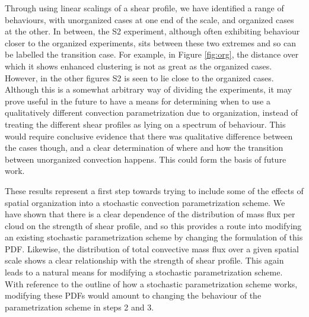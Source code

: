 \documentclass[11pt,a4paper]{article}
\newcommand\todo[1]{\textbf{TODO: #1}}
\begin{document}



Through using linear scalings of a shear profile, we have identified a range of behaviours, with unorganized cases at one end of the scale, and organized cases at the other. In between, the S2 experiment, although often exhibiting behaviour closer to the organized experiments, sits between these two extremes and so can be labelled the transition case. For example, in Figure \ref{fig:org}, the distance over which it shows enhanced clustering is not as great as the organized cases. However, in the other figures S2 is seen to lie close to the organized cases. Although this is a somewhat arbitrary way of dividing the experiments, it may prove useful in the future to have a means for determining when to use a qualitatively different convection parametrization due to organization, instead of treating the different shear profiles as lying on a spectrum of behaviour. This would require conclusive evidence that there was qualitative difference between the cases though, and a clear determination of where and how the transition between unorganized convection happens. This could form the basis of future work.

These results represent a first step towards trying to include some of the effects of spatial organization into a stochastic convection parametrization scheme. We have shown that there is a clear dependence of the distribution of mass flux per cloud on the strength of shear profile, and so this provides a route into modifying an existing stochastic parametrization scheme by changing the formulation of this PDF. Likewise, the distribution of total convective mass flux over a given spatial scale shows a clear relationship with the strength of shear profile. This again leads to a natural means for modifying a stochastic parametrization scheme. With reference to the outline of how a stochastic parametrization scheme works, modifying these PDFs would amount to changing the behaviour of the parametrization scheme in steps 2 and 3.
\end{document}
